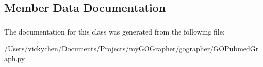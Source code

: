 \subsection{Member Data Documentation}
\hypertarget{class_g_o_pubmed_graph_1_1_g_o_pubmed_graph_a4b066933be6fecadf9084b19efae3ebc}{
\subsubsection[{excludeEvidence}]{}}
\label{class_g_o_pubmed_graph_1_1_g_o_pubmed_graph_a4b066933be6fecadf9084b19efae3ebc}
\hypertarget{class_g_o_pubmed_graph_1_1_g_o_pubmed_graph_a590b3ef9931441c36f1f335593f9e5ab}{
\subsubsection[{pubmedToNode}]{}}
\label{class_g_o_pubmed_graph_1_1_g_o_pubmed_graph_a590b3ef9931441c36f1f335593f9e5ab}


The documentation for this class was generated from the following file:\begin{DoxyCompactItemize}
\item 
/Users/vickychen/Documents/Projects/myGOGrapher/gographer/\hyperlink{_g_o_pubmed_graph_8py}{GOPubmedGraph.py}\end{DoxyCompactItemize}
